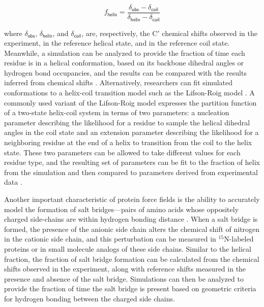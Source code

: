 \documentclass[9pt,review]{livecoms}
\begin{document}
\begin{equation}
\label{eqn:fraction_helix}
f_{\mathsf{helix}} = \frac {\delta_{\mathsf{obs}} - \delta_{\mathsf{coil}}} {\delta_{\mathsf{helix}} - \delta_{\mathsf{coil}}}
\end{equation}

\noindent where $\delta_{\mathsf{obs}}$,  $\delta_{\mathsf{helix}}$, and $\delta_{\mathsf{coil}}$, are, respectively, the C$'$ chemical shifts observed in the experiment, in the reference helical state, and in the reference coil state.
Meanwhile, a simulation can be analyzed to provide the fraction of time each residue is in a helical conformation, based on its backbone dihedral angles or hydrogen bond occupancies, and the results can be compared with the results inferred from chemical shifts \cite{best_optimized_2009}.
Alternatively, researchers can fit simulated conformations to a helix-coil transition model such as the Lifson-Roig model \cite{lifson_theory_1961}.
A commonly used variant of the Lifson-Roig model expresses the partition function of a two-state helix-coil system in terms of two parameters: a nucleation parameter describing the likelihood for a residue to sample the helical dihedral angles in the coil state and an extension parameter describing the likelihood for a neighboring residue at the end of a helix to transition from the coil to the helix state.
These two parameters can be allowed to take different values for each residue type, and the resulting set of parameters can be fit to the fraction of helix from the simulation and then compared to parameters derived from experimental data \cite{best_optimized_2009}.

Another important characteristic of protein force fields is the ability to accurately model the formation of salt bridges---pairs of amino acids whose oppositely charged side-chains are within hydrogen bonding distance \cite{donald_salt_2011}.
When a salt bridge is formed, the presence of the anionic side chain alters the chemical shift of nitrogen in the cationic side chain, and this perturbation can be measured in $^{15}$N-labeled proteins or in small molecule analogs of these side chains.
Similar to the helical fraction, the fraction of salt bridge formation can be calculated from the chemical shifts observed in the experiment, along with reference shifts measured in the presence and absence of the salt bridge.
Simulations can then be analyzed to provide the fraction of time the salt bridge is present based on geometric criteria for hydrogen bonding between the charged side chains.
\end{document}

